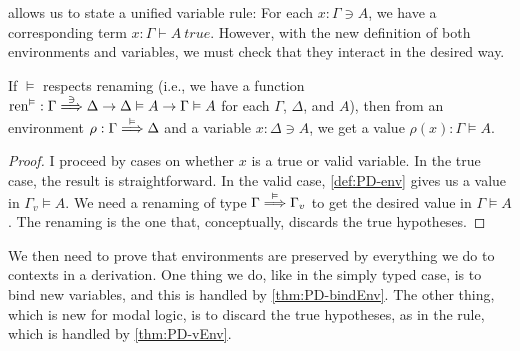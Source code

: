  allows us to state a unified variable rule: For each
$x : \Gamma \ni A$, we have a corresponding term
$x : \Gamma \vdash A~\mathit{true}$.
However, with the new definition of both environments and variables, we must
check that they interact in the desired way.

\begin{lemma}[lookup]\label{thm:PD-lookup}
  If $\vDash$ respects renaming (i.e., we have a function
  $\mathrm{ren}^\vDash :
  \Gamma \stackrel{\ni}\Longrightarrow \Delta \to \Delta \vDash A \to \Gamma \vDash A$
  for each $\Gamma$, $\Delta$, and $A$), then
  from an environment $\rho : \Gamma \stackrel{\vDash}\Longrightarrow \Delta$ and a variable
  $x : \Delta \ni A$, we get a value $\rho(x) : \Gamma \vDash A$.
\end{lemma}
\begin{proof}
  I proceed by cases on whether $x$ is a true or valid variable.
  In the true case, the result is straightforward.
  In the valid case, \cref{def:PD-env} gives us a value in $\Gamma_v \vDash A$.
  We need a renaming of type $\Gamma \stackrel{\vDash}\Longrightarrow \Gamma_v$ to get the desired
  value in $\Gamma \vDash A$.
  The renaming is the one that, conceptually, discards the true hypotheses.
\end{proof}

We then need to prove that environments are preserved by everything we do to
contexts in a derivation.
One thing we do, like in the simply typed case, is to bind new variables, and
this is handled by \cref{thm:PD-bindEnv}.
The other thing, which is new for modal logic, is to discard the true
hypotheses, as in the  rule, which is handled by
\cref{thm:PD-vEnv}.

